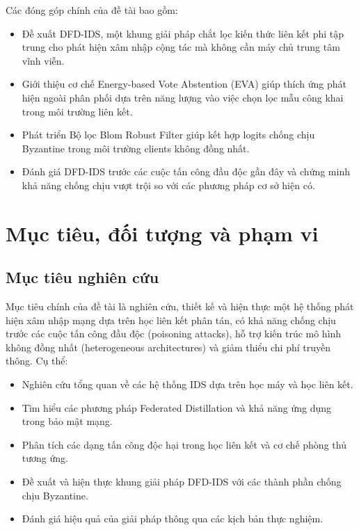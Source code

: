 Các đóng góp chính của đề tài bao gồm:
\begin{itemize}
    \item Đề xuất DFD-IDS, một khung giải pháp chắt lọc kiến thức liên kết phi tập trung cho phát hiện xâm nhập cộng tác mà không cần máy chủ trung tâm vĩnh viễn.
    \item Giới thiệu cơ chế Energy-based Vote Abstention (EVA) giúp thích ứng phát hiện ngoài phân phối dựa trên năng lượng vào việc chọn lọc mẫu công khai trong môi trường liên kết.
    \item Phát triển Bộ lọc Blom Robust Filter giúp kết hợp logits chống chịu Byzantine trong môi trường clients không đồng nhất.
    \item Đánh giá DFD-IDS trước các cuộc tấn công đầu độc gần đây và chứng minh khả năng chống chịu vượt trội so với các phương pháp cơ sở hiện có.
\end{itemize}

\section{Mục tiêu, đối tượng và phạm vi}
\label{sec:objectives}

\subsection{Mục tiêu nghiên cứu}
Mục tiêu chính của đề tài là nghiên cứu, thiết kế và hiện thực một hệ thống phát hiện xâm nhập mạng dựa trên học liên kết phân tán, có khả năng chống chịu trước các cuộc tấn công đầu độc (poisoning attacks), hỗ trợ kiến trúc mô hình không đồng nhất (heterogeneous architectures) và giảm thiểu chi phí truyền thông. Cụ thể:

\begin{itemize}
    \item Nghiên cứu tổng quan về các hệ thống IDS dựa trên học máy và học liên kết.
    \item Tìm hiểu các phương pháp Federated Distillation và khả năng ứng dụng trong bảo mật mạng.
    \item Phân tích các dạng tấn công độc hại trong học liên kết và cơ chế phòng thủ tương ứng.
    \item Đề xuất và hiện thực khung giải pháp DFD-IDS với các thành phần chống chịu Byzantine.
    \item Đánh giá hiệu quả của giải pháp thông qua các kịch bản thực nghiệm.
\end{itemize}

